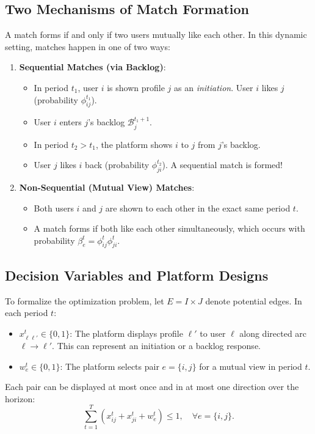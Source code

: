 \documentclass[11pt,letterpaper]{article}
\theoremstyle{definition}
\theoremstyle{plain}
\theoremstyle{remark}
\begin{document}
\subsection{Two Mechanisms of Match Formation}
A match forms if and only if two users mutually like each other. In this dynamic setting, matches happen in one of two ways:
\begin{enumerate}[leftmargin=2em]
    \item \textbf{Sequential Matches (via Backlog)}:
    \begin{itemize}
        \item In period $t_1$, user $i$ is shown profile $j$ as an \emph{initiation}. User $i$ likes $j$ (probability $\phi_{ij}^{t_1}$).
        \item User $i$ enters $j$'s backlog $\mathcal{B}_j^{t_1+1}$.
        \item In period $t_2 > t_1$, the platform shows $i$ to $j$ from $j$'s backlog.
        \item User $j$ likes $i$ back (probability $\phi_{ji}^{t_2}$). A sequential match is formed!
    \end{itemize}
    \item \textbf{Non-Sequential (Mutual View) Matches}:
    \begin{itemize}
        \item Both users $i$ and $j$ are shown to each other in the exact same period $t$.
        \item A match forms if both like each other simultaneously, which occurs with probability $\beta_e^t = \phi_{ij}^t \phi_{ji}^t$.
    \end{itemize}
\end{enumerate}

\subsection{Decision Variables and Platform Designs}
To formalize the optimization problem, let $E = I \times J$ denote potential edges. In each period $t$:
\begin{itemize}[leftmargin=2em]
    \item $x_{\ell\ell'}^t \in \{0, 1\}$: The platform displays profile $\ell'$ to user $\ell$ along directed arc $\ell \to \ell'$. This can represent an initiation or a backlog response.
    \item $w_e^t \in \{0, 1\}$: The platform selects pair $e = \{i, j\}$ for a mutual view in period $t$.
\end{itemize}
Each pair can be displayed at most once and in at most one direction over the horizon:
\begin{equation}
    \sum_{t=1}^T \left( x_{ij}^t + x_{ji}^t + w_e^t \right) \le 1, \quad \forall e = \{i,j\}.
\end{equation}
\end{document}
